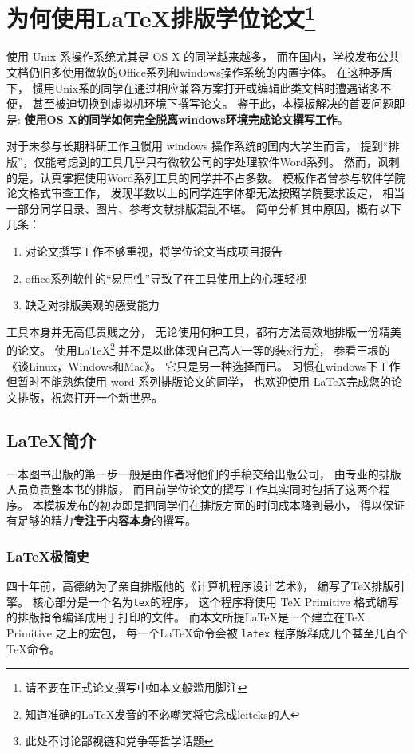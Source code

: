 
\chapter{为何使用\LaTeX 排版学位论文\footnote{请不要在正式论文撰写中如本文般滥用脚注}}

使用 Unix 系操作系统尤其是 OS X 的同学越来越多，
而在国内，学校发布公共文档仍旧多使用微软的Office系列和windows操作系统的内置字体。
在这种矛盾下，
惯用Unix系的同学在通过相应兼容方案打开或编辑此类文档时遭遇诸多不便，
甚至被迫切换到虚拟机环境下撰写论文。
鉴于此，本模板解决的首要问题即是:
\textbf{使用OS X的同学如何完全脱离windows环境完成论文撰写工作}。

对于未参与长期科研工作且惯用 windows 操作系统的国内大学生而言，
提到“排版”，仅能考虑到的工具几乎只有微软公司的字处理软件Word系列。
然而，讽刺的是，认真掌握使用Word系列工具的同学并不占多数。
模板作者曾参与软件学院论文格式审查工作，
发现半数以上的同学连字体都无法按照学院要求设定，
相当一部分同学目录、图片、参考文献排版混乱不堪。
简单分析其中原因，概有以下几条：
\begin{enumerate}
    \item 对论文撰写工作不够重视，将学位论文当成项目报告
    \item office系列软件的“易用性”导致了在工具使用上的心理轻视
    \item 缺乏对排版美观的感受能力
\end{enumerate}

工具本身并无高低贵贱之分，
无论使用何种工具，都有方法高效地排版一份精美的论文。
使用\LaTeX \footnote{知道准确的\LaTeX 发音的不必嘲笑将它念成leiteks的人}
并不是以此体现自己高人一等的装x行为\footnote{此处不讨论鄙视链和党争等哲学话题}，
参看王垠的《谈Linux，Windows和Mac》\cite{yinwang2013}。
它只是另一种选择而已。
习惯在windows下工作但暂时不能熟练使用 word 系列排版论文的同学，
也欢迎使用 \LaTeX 完成您的论文排版，祝您打开一个新世界。

\section{\LaTeX  简介}
一本图书出版的第一步一般是由作者将他们的手稿交给出版公司，
由专业的排版人员负责整本书的排版，
而目前学位论文的撰写工作其实同时包括了这两个程序。
本模板发布的初衷即是把同学们在排版方面的时间成本降到最小，
得以保证有足够的精力\textbf{专注于内容本身}的撰写。

\subsection{\LaTeX 极简史}
四十年前，高德纳为了亲自排版他的《计算机程序设计艺术》，
编写了\TeX 排版引擎。
核心部分是一个名为\texttt{tex}的程序，
这个程序将使用 TeX Primitive 格式编写的排版指令编译成用于打印的文件。
而本文所提\LaTeX 是一个建立在TeX Primitive 之上的宏包，
每一个\LaTeX 命令会被 \texttt{latex} 程序解释成几个甚至几百个\TeX 命令。

